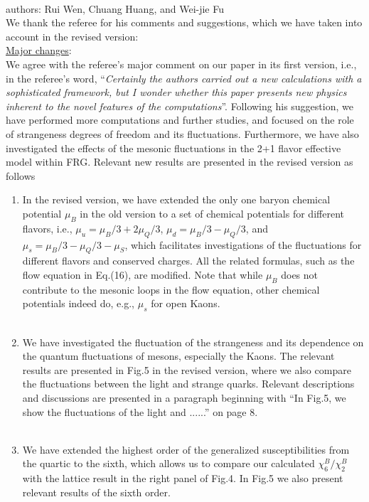 \documentclass[aps,article,author-year,notitlepage,showpacs]{revtex4-1}
\begin{document}
 

\large

\\

\noindent authors: Rui Wen, Chuang Huang, and Wei-jie Fu\\

\noindent We thank the referee for his comments and suggestions, which we have taken into account in the revised version:\\

\noindent \underline{Major changes}:\\

We agree with the referee's major comment on our paper in its first version, i.e., in the referee's word, ``{\it Certainly the authors carried out a new calculations with a sophisticated framework, but I wonder whether this paper presents new physics inherent to the novel features of the computations}''. Following his suggestion, we have performed more computations and further studies, and focused on the role of strangeness degrees of freedom and its fluctuations. Furthermore, we have also investigated the effects of the mesonic fluctuations in the 2+1 flavor effective model within FRG. Relevant new results are presented in the revised version as follows

\begin{enumerate}[1.]

\item In the revised version, we have extended the only one baryon chemical potential $\mu_B$ in the old version to a set of chemical potentials for different flavors, i.e., $\mu_u=\mu_B/3+2\mu_Q/3$, $\mu_d=\mu_B/3-\mu_Q/3$, and $\mu_s=\mu_B/3-\mu_Q/3-\mu_S$, which facilitates investigations of the fluctuations for different flavors and conserved charges. All the related formulas, such as the flow equation in Eq.(16), are modified. Note that while $\mu_B$ does not contribute to the mesonic loops in the flow equation, other chemical potentials indeed do, e.g., $\mu_s$ for open Kaons.\\[-3ex] 

\item We have investigated the fluctuation of the strangeness and its dependence on the quantum fluctuations of mesons, especially the Kaons. The relevant results are presented in Fig.5 in the revised version, where we also compare the fluctuations between the light and strange quarks. Relevant descriptions and discussions are presented in a paragraph beginning with ``In Fig.5, we show the fluctuations of the light and ......'' on page 8.\\[-3ex] 

\item We have extended the highest order of the generalized susceptibilities from the quartic to the sixth, which allows us to compare our calculated $\chi^{B}_6/\chi^{B}_2$ with the lattice result in the right panel of Fig.4. In Fig.5 we also present relevant results of the sixth order.\\[1ex]

\end{enumerate}
\end{document}
